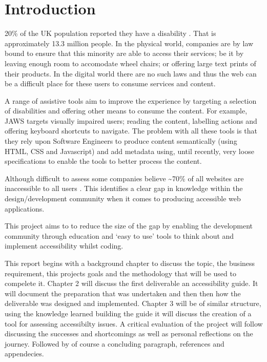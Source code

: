 \chapter{Introduction}
\label{introduction}
20\% of the UK population reported they have a disability
\citep{UkGovFamilySurvey}.
That is approximately 13.3 million people. In the physical world,
companies are by law
bound \citep{DDA} to ensure that this minority are able to access their services; be it by
leaving enough room to accomodate wheel chairs; or offering large text prints
of their products. In the digital world there are no such laws and thus the web can be a
difficult place for these users to consume services and content.

A range of assistive
tools aim to improve the experience by targeting a selection of
disabilities and offering other means to consume the content. For example,
JAWS \citep{JAWS} targets visually impaired users; reading the content,
labelling actions and offering keyboard shortcuts to navigate. The
problem
with all these tools is that they rely upon Software Engineers to produce
content semantically (using HTML, CSS and Javascript) and add metadata using,
until recently,
very loose specifications \citep{WCAG} to enable the tools to better process
the content.

Although difficult to assess some companies believe \textasciitilde70\% of all
websites are inaccessible to all users \citep{Slate} \citep{SightAndSound}.
This identifies a clear gap in knowledge within the design/development community
when it comes to producing accessible web applications.

This project aims to to reduce the size of the gap by enabling the development
community through education and `easy to use' tools to think about and
implement accessibility whilst coding.

This report begins with a background chapter to discuss the topic, the business
requirement, this projects goals and the methodology that will be used to
compelete it. Chapter 2 will discuss the first deliverable an
accessibility guide. It will document the preparation that was undertaken and
then then how the deliverable was designed and implemented. Chapter 3 will be
of similar structure, using the knowledge learned building the guide it will
discuss the creation of a tool for assessing accessibilty issues. A
critical evaluation of the project will follow discussing the successes
and shortcomings as well as personal reflections on the journey. Followed by
of course a concluding paragraph, references and appendecies.

